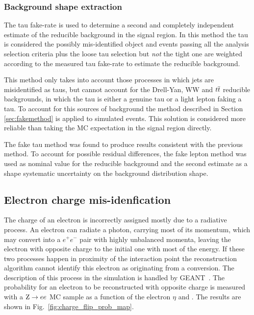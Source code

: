 \subsubsection{Background shape extraction}

The tau fake-rate is used to determine a second and completely independent estimate of the reducible background in the signal region.
In this method the tau is considered the possibly mis-identified object and events passing all the analysis selection criteria plus the loose tau
selection but \emph{not} the tight one are weighted according to the measured tau fake-rate to estimate the reducible background.

This method only takes into account those processes in which jets are misidentified as taus, but cannot account for the Drell-Yan, WW and $t\overline{t}$ reducible backgrounds,
in which the tau is either a genuine tau or a light lepton faking a tau. To account for this sources of background the method described in Section \ref{sec:fakemethod}
is applied to simulated events. This solution is considered more reliable than taking the MC expectation in the signal region directly.

The fake tau method was found to produce results consistent with the previous method. To account for possible residual differences,
the fake lepton method was used as nominal value for the reducible background and the second estimate as a shape systematic uncertainty on the background distribution shape.

\subsection{Electron charge mis-idenfication}
\label{sec:charge_misid}

The charge of an electron is incorrectly assigned mostly due to a radiative process. An electron can radiate a photon, carrying most of its momentum, which may convert into a $e^+e^-$ pair with highly unbalanced momenta, leaving the electron with opposite charge to the initial one with most of the energy. If these two processes
happen in proximity of the interaction point the reconstruction algorithm cannot identify this electron as originating from a conversion.
The description of this process in the simulation is handled by \textsc{GEANT}~\cite{geant}. The probability for an electron to be reconstructed with opposite charge is measured
with a $\mathrm{Z} \rightarrow ee$ MC sample as a function of the electron $\eta$ and \pT. The results are shown in Fig.~\ref{fig:charge_flip_prob_map}.

